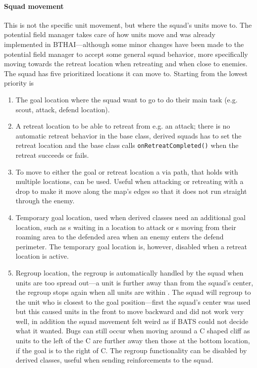 \paragraph{Squad movement}
This is not the specific unit movement, but where the squad's units move to. The potential field manager takes care of how units move and was already implemented in BTHAI\cite{bthai}—although some minor changes have been made to the potential field manager to accept some general squad behavior, more specifically moving towards the retreat location when retreating and when close to enemies. The squad has five prioritized locations it can move to. Starting from the lowest priority is
\begin{enumerate}
	\item The goal location where the squad want to go to do their main task (e.g. scout, attack, defend location).
	\item A retreat location to be able to retreat from e.g. an attack; there is no automatic retreat behavior in the base class, derived squads has to set the retreat location and the base class calls \texttt{onRetreatCompleted()} when the retreat succeeds or fails.
	\item To move to either the goal or retreat location a via path, that holds with multiple locations, can be used. Useful when attacking or retreating with a drop to make it move along the map's edges so that it does not run straight through the enemy.
	\item Temporary goal location, used when derived classes need an additional goal location, such as s waiting in a location to attack or s moving from their roaming area to the defended area when an enemy enters the defend perimeter. The temporary goal location is, however, disabled when a retreat location is active.
	\item Regroup location, the regroup is automatically handled by the squad when units are too spread out—a unit is further away than \squadRegroupDistanceBegin from the squad's center, the regroup stops again when all units are within \squadRegroupDistanceEnd. The squad will regroup to the unit who is closest to the goal position—first the squad's center was used but this caused units in the front to move backward and did not work very well, in addition the squad movement felt weird as if BATS could not decide what it wanted. Bugs can still occur when moving around a C shaped cliff as units to the left of the C are further away then those at the bottom location, if the goal is to the right of C. The regroup functionality can be disabled by derived classes, useful when sending reinforcements to the squad.
\end{enumerate}

